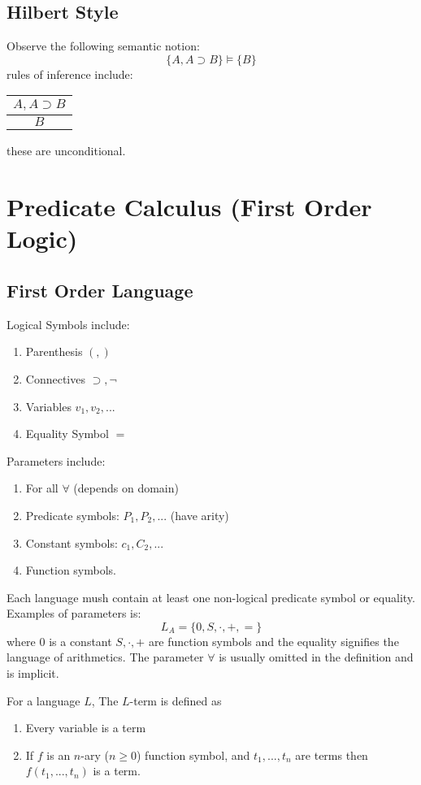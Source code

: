 \documentclass[twoside]{article}
\begin{document}
\subsection{Hilbert Style}
Observe the following semantic notion:
\[\{A, A \supset B\} \vDash \{B\}\]
rules of inference include:
\begin{tabular}{c}
$A, A \supset B$ \\
\hline
$B$ \\
\end{tabular}
these are unconditional.

\section{Predicate Calculus (First Order Logic)}
\subsection{First Order Language}
Logical Symbols include:
\begin{enumerate}
\item Parenthesis $(,)$
\item Connectives $\supset, \lnot$
\item Variables $v_1, v_2, ...$
\item Equality Symbol $=$
\end{enumerate}

Parameters include:
\begin{enumerate}
\item For all $\forall$ (depends on domain)
\item Predicate symbols: $P_1, P_2, ...$ (have arity)
\item Constant symbols: $c_1, C_2, ...$
\item Function symbols.
\end{enumerate}
Each language mush contain at least one non-logical predicate symbol or equality. Examples of parameters is:
\[L_A = \{0, S, \cdot, +, =\}\]
where $0$ is a constant $S, \cdot, + $ are function symbols and the equality signifies the language of arithmetics. The parameter $\forall$ is usually omitted in the definition and is implicit.

For a language $L$, The $L$-term is defined as
\begin{enumerate}
\item Every variable is a term
\item If $f$ is an $n$-ary ($n\geq 0$) function symbol, and $t_1, ..., t_n$ are terms then $f(t_1, ..., t_n)$ is a term. 
\end{enumerate}
\end{document}
